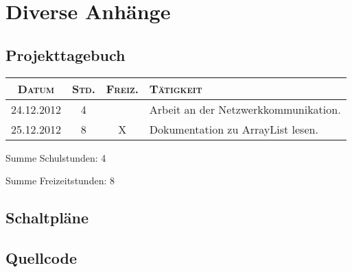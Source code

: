 

\chapter{Diverse Anhänge}


\section{Projekttagebuch}



\begin{longtable}[l]{|c|c|c|p{10cm}|}
\hline
{\scshape\bfseries Datum} & {\scshape\bfseries Std.} & {\scshape\bfseries Freiz.} & {\scshape\bfseries Tätigkeit} \\\hline\hline\endhead
24.12.2012 & 4 &  & Arbeit an der Netzwerkkommunikation.\\\hline
25.12.2012 & 8 & X & Dokumentation zu ArrayList lesen.\\\hline
\end{longtable}

Summe Schulstunden: 4\par
Summe Freizeitstunden: 8

\section{Schaltpläne}


\section{Quellcode}


